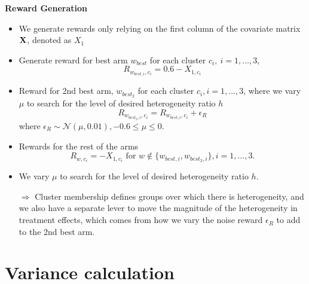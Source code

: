 \documentclass[letterpaper, 12pt, parskip=full,DIV=10]{scrartcl}
\begin{document}
\textbf{Reward Generation}
\begin{itemize}
   \item We generate rewards only relying on the first column of the covariate matrix $\mathbf{X}$, denoted as $X_1$
    \item Generate reward for best arm $w_{best}$ for each cluster $c_i,  \ i = 1, \dots, 3$, \[R_{w_{best, i}, c_i} = 0.6 - X_{1, c_i}\]
    \item Reward for 2nd best arm, $w_{best_2}$ for each cluster $c_i,  i = 1, \dots, 3$, where we vary $\mu$ to search for the level of desired heterogeneity ratio $h$
    $$R_{w_{best_2, i}, c_i} = R_{w_{best, i}, c_i} + \epsilon_R $$ where $\epsilon_R \sim \mathcal{N}(\mu, 0.01), -0.6 \le \mu \le 0$. 
    \item Rewards for the rest of the arms
    $$R_{w, c_i} = -X_{1, c_i} \mbox{ for }  w \not\in \{w_{best, i}, w_{best_2, i}\}, i = 1, \dots, 3.$$
    \item We vary $\mu$ to search for the level of desired heterogeneity ratio $h$.
        \item[$\Rightarrow$] Cluster membership defines groups over which there is heterogeneity, and we also have a separate lever to move the magnitude of the heterogeneity in treatment effects, which comes from how we vary the noise reward $\epsilon_R$ to add to the 2nd best arm. 
\end{itemize}

\section{Variance calculation}


\end{document}
